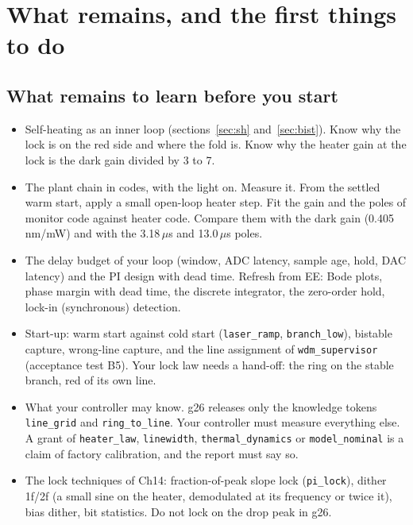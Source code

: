 \documentclass[11pt,letterpaper]{article}
\newcommand{\us}{\,\ensuremath{\mu}s}
\begin{document}
\section{What remains, and the first things to do}\label{sec:next}

\subsection*{What remains to learn before you start}
\begin{itemize}
\item[$\square$] Self-heating as an inner loop (sections~\ref{sec:sh} and~\ref{sec:bist}). Know why the lock is on
  the red side and where the fold is. Know why the heater gain at the lock is the dark gain divided by 3 to 7.
\item[$\square$] The plant chain in codes, with the light on. Measure it. From the settled warm start, apply a small
  open-loop heater step. Fit the gain and the poles of monitor code against heater code. Compare them with the dark
  gain (0.405\,nm/mW) and with the 3.18\us{} and 13.0\us{} poles.
\item[$\square$] The delay budget of your loop (window, ADC latency, sample age, hold, DAC latency) and the PI design
  with dead time. Refresh from EE: Bode plots, phase margin with dead time, the discrete integrator, the zero-order
  hold, lock-in (synchronous) detection.
\item[$\square$] Start-up: warm start against cold start (\texttt{laser\_ramp}, \texttt{branch\_low}), bistable
  capture, wrong-line capture, and the line assignment of \texttt{wdm\_supervisor} (acceptance test B5). Your lock
  law needs a hand-off: the ring on the stable branch, red of its own line.
\item[$\square$] What your controller may know. g26 releases only the knowledge tokens \texttt{line\_grid} and
  \texttt{ring\_to\_line}. Your controller must measure everything else. A grant of \texttt{heater\_law},
  \texttt{linewidth}, \texttt{thermal\_dynamics} or \texttt{model\_nominal} is a claim of factory calibration, and
  the report must say so.
\item[$\square$] The lock techniques of Ch14: fraction-of-peak slope lock (\texttt{pi\_lock}), dither 1f/2f (a small
  sine on the heater, demodulated at its frequency or twice it), bias dither, bit statistics. Do not lock on the drop
  peak in g26.

\end{itemize}
\end{document}

